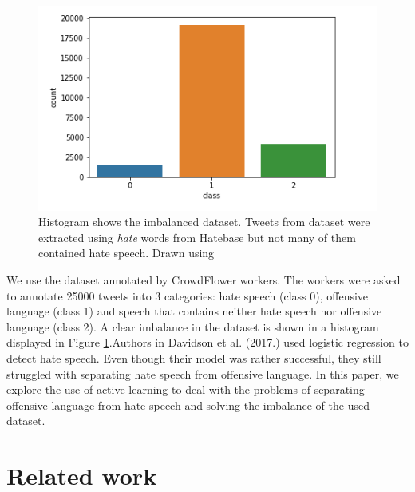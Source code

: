 \documentclass[10pt, a4paper]{article}
\begin{document}
\begin{figure}[h]
	\includegraphics[width=1.1\linewidth, height=0.25\textheight]{pictures/HistOfData}
	\caption[Histogram showing number of labeled classes]{Histogram shows the imbalanced dataset. Tweets from dataset were extracted using \textit{hate} words from Hatebase but not many of them contained hate speech. Drawn using \citep{Matplotlib,seaborn}}
	\label{fig:histofdata}
\end{figure}

We use the dataset annotated by CrowdFlower workers. The workers were asked to annotate 25000 tweets into 3 categories: hate speech (class 0), offensive language (class 1) and speech that contains neither hate speech nor offensive language (class 2). A clear imbalance in the dataset is shown in a histogram displayed in Figure \ref{fig:histofdata}.Authors in Davidson et al. (2017.) used logistic regression to detect hate speech. Even though their model was rather successful, they still struggled with separating hate speech from offensive language. In this paper, we explore the use of active learning to deal with the problems of separating offensive language from hate speech and solving the imbalance of the used dataset.


\section{Related work}
\end{document}

